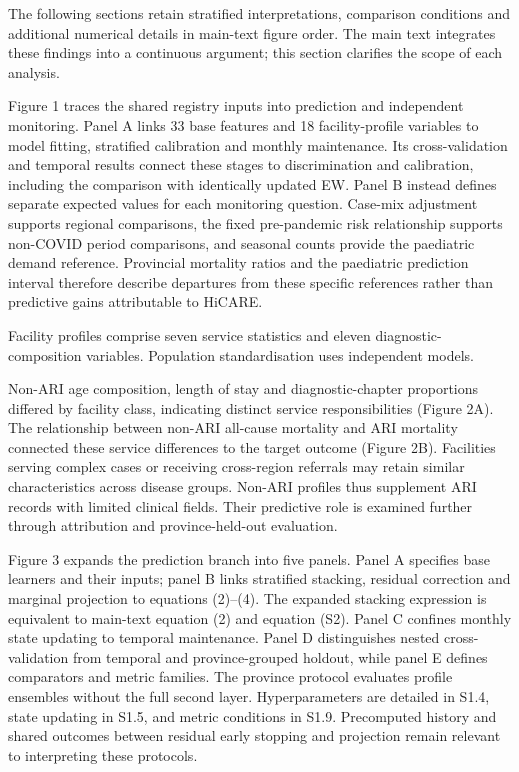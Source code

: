 \documentclass[11pt,a4paper]{article}
\newcommand{\mainheading}[1]{\par\needspace{4\baselineskip}\vspace{7pt}{\large\bfseries #1}\par\vspace{3pt}}
\newcommand{\subheading}[1]{\par\needspace{3\baselineskip}\vspace{5pt}{\bfseries #1}\par\vspace{1pt}}
\begin{document}
\clearpage
\mainheading{S4 Extended interpretation of main-text figures}
The following sections retain stratified interpretations, comparison conditions and additional numerical details in main-text figure order. The main text integrates these findings into a continuous argument; this section clarifies the scope of each analysis.

\subheading{Figure 1. Risk estimation and independent population monitoring.}
Figure 1 traces the shared registry inputs into prediction and independent monitoring. Panel A links 33 base features and 18 facility-profile variables to model fitting, stratified calibration and monthly maintenance. Its cross-validation and temporal results connect these stages to discrimination and calibration, including the comparison with identically updated EW. Panel B instead defines separate expected values for each monitoring question. Case-mix adjustment supports regional comparisons, the fixed pre-pandemic risk relationship supports non-COVID period comparisons, and seasonal counts provide the paediatric demand reference. Provincial mortality ratios and the paediatric prediction interval therefore describe departures from these specific references rather than predictive gains attributable to HiCARE.

{\small Facility profiles comprise seven service statistics and eleven diagnostic-composition variables. Population standardisation uses independent models.\par}
\subheading{Figure 2. Facility profiles. (A) Mean non-ARI profiles by facility class. (B) Facility-group non-ARI all-cause mortality versus ARI mortality.}
Non-ARI age composition, length of stay and diagnostic-chapter proportions differed by facility class, indicating distinct service responsibilities (Figure 2A). The relationship between non-ARI all-cause mortality and ARI mortality connected these service differences to the target outcome (Figure 2B). Facilities serving complex cases or receiving cross-region referrals may retain similar characteristics across disease groups. Non-ARI profiles thus supplement ARI records with limited clinical fields. Their predictive role is examined further through attribution and province-held-out evaluation.

\subheading{Figure 3. HiCARE stratified calibration, temporal updating and evaluation protocols.}
Figure 3 expands the prediction branch into five panels. Panel A specifies base learners and their inputs; panel B links stratified stacking, residual correction and marginal projection to equations (2)–(4). The expanded stacking expression is equivalent to main-text equation (2) and equation (S2). Panel C confines monthly state updating to temporal maintenance. Panel D distinguishes nested cross-validation from temporal and province-grouped holdout, while panel E defines comparators and metric families. The province protocol evaluates profile ensembles without the full second layer. Hyperparameters are detailed in S1.4, state updating in S1.5, and metric conditions in S1.9. Precomputed history and shared outcomes between residual early stopping and projection remain relevant to interpreting these protocols.
\end{document}
